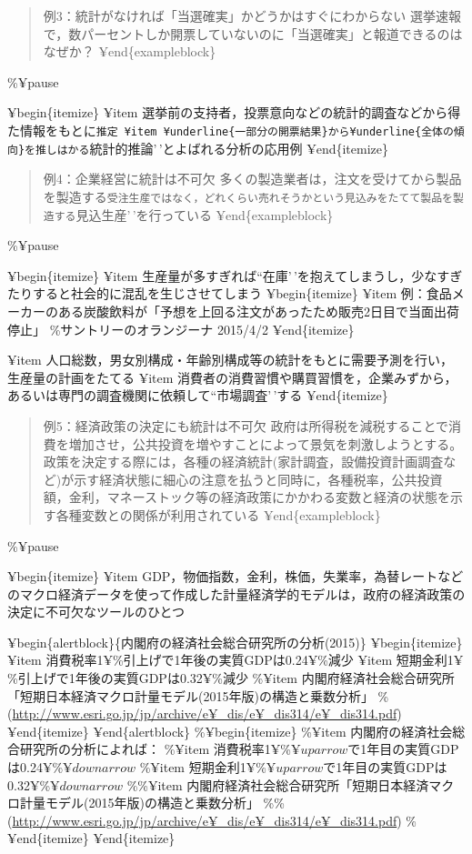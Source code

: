 \documentclass[
]{book}
\theoremstyle{definition}
\theoremstyle{definition}
\theoremstyle{definition}
\theoremstyle{definition}
\theoremstyle{remark}
\begin{document}
\begin{quote}
例3：統計がなければ「当選確実」かどうかはすぐにわからない
選挙速報で，数パーセントしか開票していないのに「当選確実」と報道できるのはなぜか？
¥end\{exampleblock\}
\end{quote}

\%¥pause

¥begin\{itemize\}
¥item 選挙前の支持者，投票意向などの統計的調査などから得た情報をもとに\texttt{推定\textquotesingle{}\textquotesingle{}\ ¥item\ ¥underline\{一部分の開票結果\}から¥underline\{全体の傾向\}を推しはかる}統計的推論'\,'とよばれる分析の応用例
¥end\{itemize\}

\begin{quote}
例4：企業経営に統計は不可欠
多くの製造業者は，注文を受けてから製品を製造する\texttt{受注生産\textquotesingle{}\textquotesingle{}ではなく，どれくらい売れそうかという見込みをたてて製品を製造する}見込生産'\,'を行っている
¥end\{exampleblock\}
\end{quote}

\%¥pause

¥begin\{itemize\}
¥item 生産量が多すぎれば``在庫'\,'を抱えてしまうし，少なすぎたりすると社会的に混乱を生じさせてしまう
¥begin\{itemize\}
¥item 例：食品メーカーのある炭酸飲料が「予想を上回る注文があったため販売2日目で当面出荷停止」
\%サントリーのオランジーナ 2015/4/2
¥end\{itemize\}

¥item 人口総数，男女別構成・年齢別構成等の統計をもとに需要予測を行い，生産量の計画をたてる
¥item 消費者の消費習慣や購買習慣を，企業みずから，あるいは専門の調査機関に依頼して``市場調査'\,'する
¥end\{itemize\}

\begin{quote}
例5：経済政策の決定にも統計は不可欠
政府は所得税を減税することで消費を増加させ，公共投資を増やすことによって景気を刺激しようとする。政策を決定する際には，各種の経済統計(家計調査，設備投資計画調査など)が示す経済状態に細心の注意を払うと同時に，各種税率，公共投資額，金利，マネーストック等の経済政策にかかわる変数と経済の状態を示す各種変数との関係が利用されている
¥end\{exampleblock\}
\end{quote}

\%¥pause

¥begin\{itemize\}
¥item GDP，物価指数，金利，株価，失業率，為替レートなどのマクロ経済データを使って作成した計量経済学的モデルは，政府の経済政策の決定に不可欠なツールのひとつ

¥begin\{alertblock\}\{内閣府の経済社会総合研究所の分析(2015)\}
¥begin\{itemize\}
¥item 消費税率1¥\%引上げで1年後の実質GDPは0.24¥\%減少
¥item 短期金利1¥\%引上げで1年後の実質GDPは0.32¥\%減少
\%¥item 内閣府経済社会総合研究所「短期日本経済マクロ計量モデル(2015年版)の構造と乗数分析」
\%(\url{http://www.esri.go.jp/jp/archive/e¥_dis/e¥_dis314/e¥_dis314.pdf})
¥end\{itemize\}
¥end\{alertblock\}
\%¥begin\{itemize\}
\%¥item 内閣府の経済社会総合研究所の分析によれば：
\%¥item 消費税率1¥\%\(¥uparrow\)で1年目の実質GDPは0.24¥\%\(¥downarrow\)
\%¥item 短期金利1¥\%\(¥uparrow\)で1年目の実質GDPは0.32¥\%\(¥downarrow\)
\%\%¥item 内閣府経済社会総合研究所「短期日本経済マクロ計量モデル(2015年版)の構造と乗数分析」
\%\%(\url{http://www.esri.go.jp/jp/archive/e¥_dis/e¥_dis314/e¥_dis314.pdf})
\%¥end\{itemize\}
¥end\{itemize\}
\end{document}
